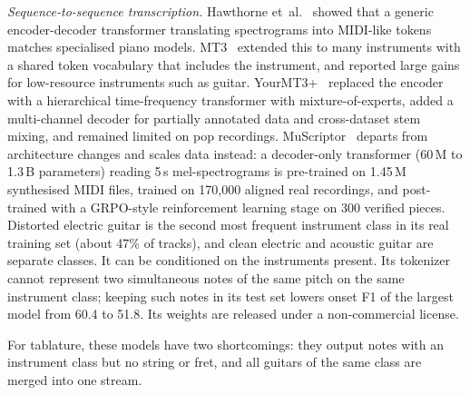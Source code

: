 \emph{Sequence-to-sequence transcription.} Hawthorne
et~al.~\cite{hawthorne2021seq2seq} showed that a generic encoder-decoder
transformer translating spectrograms into MIDI-like tokens matches
specialised piano models. MT3~\cite{gardner2022mt3} extended this to many
instruments with a shared token vocabulary that includes the instrument, and
reported large gains for low-resource instruments such as guitar.
YourMT3+~\cite{chang2024yourmt3} replaced the encoder with a hierarchical
time-frequency transformer with mixture-of-experts, added a multi-channel
decoder for partially annotated data and cross-dataset stem mixing, and
remained limited on pop recordings. MuScriptor~\cite{rouard2026muscriptor}
departs from architecture changes and scales data instead: a decoder-only
transformer (60\,M to 1.3\,B parameters) reading 5\,s mel-spectrograms is
pre-trained on 1.45\,M synthesised MIDI files, trained on 170,000 aligned real
recordings, and post-trained with a GRPO-style reinforcement learning stage on
300 verified pieces. Distorted electric guitar is the second most frequent
instrument class in its real training set (about 47\% of tracks), and clean
electric and acoustic guitar are separate classes. It can be conditioned on
the instruments present. Its tokenizer cannot represent two simultaneous notes
of the same pitch on the same instrument class; keeping such notes in its test
set lowers onset F1 of the largest model from 60.4 to 51.8. Its weights are
released under a non-commercial license.

For tablature, these models have two shortcomings: they output notes with an
instrument class but no string or fret, and all guitars of the same class are
merged into one stream.


